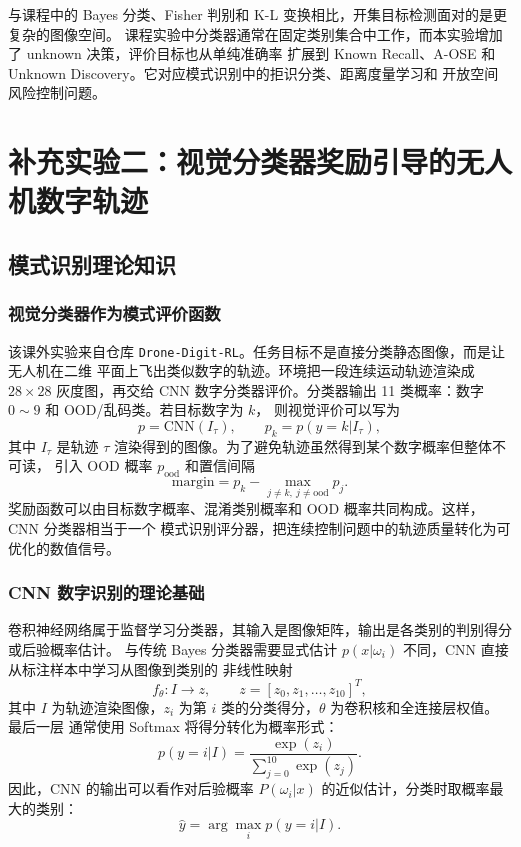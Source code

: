 \documentclass[UTF8,a4paper,12pt]{ctexart}
\begin{document}
与课程中的 Bayes 分类、Fisher 判别和 K-L 变换相比，开集目标检测面对的是更复杂的图像空间。
课程实验中分类器通常在固定类别集合中工作，而本实验增加了 unknown 决策，评价目标也从单纯准确率
扩展到 Known Recall、A-OSE 和 Unknown Discovery。它对应模式识别中的拒识分类、距离度量学习和
开放空间风险控制问题。

\clearpage
\section{补充实验二：视觉分类器奖励引导的无人机数字轨迹}

\subsection{模式识别理论知识}

\subsubsection{视觉分类器作为模式评价函数}

该课外实验来自仓库 \texttt{Drone-Digit-RL}。任务目标不是直接分类静态图像，而是让无人机在二维
平面上飞出类似数字的轨迹。环境把一段连续运动轨迹渲染成 $28\times28$ 灰度图，再交给 CNN
数字分类器评价。分类器输出 11 类概率：数字 $0\sim9$ 和 OOD/乱码类。若目标数字为 $k$，
则视觉评价可以写为
\begin{equation}
  p=\mathrm{CNN}(I_{\tau}),\qquad p_k=p(y=k|I_{\tau}),
\end{equation}
其中 $I_{\tau}$ 是轨迹 $\tau$ 渲染得到的图像。为了避免轨迹虽然得到某个数字概率但整体不可读，
引入 OOD 概率 $p_{\mathrm{ood}}$ 和置信间隔
\begin{equation}
  \mathrm{margin}=p_k-\max_{j\ne k,\ j\ne \mathrm{ood}}p_j .
\end{equation}
奖励函数可以由目标数字概率、混淆类别概率和 OOD 概率共同构成。这样，CNN 分类器相当于一个
模式识别评分器，把连续控制问题中的轨迹质量转化为可优化的数值信号。

\subsubsection{CNN 数字识别的理论基础}

卷积神经网络属于监督学习分类器，其输入是图像矩阵，输出是各类别的判别得分或后验概率估计。
与传统 Bayes 分类器需要显式估计 $p(x|\omega_i)$ 不同，CNN 直接从标注样本中学习从图像到类别的
非线性映射
\begin{equation}
  f_{\theta}: I \rightarrow z,\qquad
  z=[z_0,z_1,\ldots,z_{10}]^T ,
\end{equation}
其中 $I$ 为轨迹渲染图像，$z_i$ 为第 $i$ 类的分类得分，$\theta$ 为卷积核和全连接层权值。最后一层
通常使用 Softmax 将得分转化为概率形式：
\begin{equation}
  p(y=i|I)=\frac{\exp(z_i)}{\sum_{j=0}^{10}\exp(z_j)} .
\end{equation}
因此，CNN 的输出可以看作对后验概率 $P(\omega_i|x)$ 的近似估计，分类时取概率最大的类别：
\begin{equation}
  \hat{y}=\arg\max_i p(y=i|I).
\end{equation}
\end{document}
